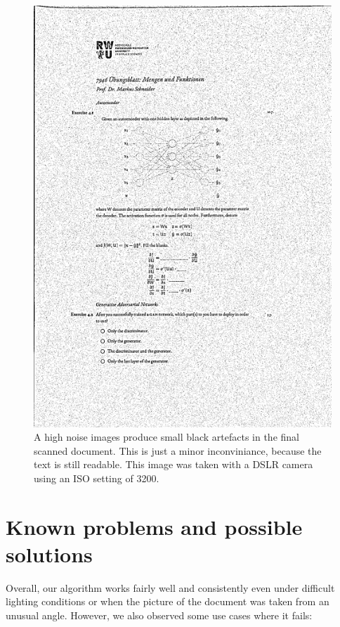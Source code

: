 \documentclass[bibliography=totoc]{scrartcl}
\begin{document}
	\begin{figure}[h!]
		\centering
		\includegraphics[width=0.3\linewidth]{imgs/threshold/noise.jpg}
		\caption{A high noise images produce small black artefacts in the final scanned document. This is just a minor inconviniance, because the text is still readable. This image was taken with a \acs{DSLR} camera using an ISO setting of 3200.}
		\label{fig:noise}
	\end{figure}

	\section{Known problems and possible solutions}
	Overall, our algorithm works fairly well and consistently even under difficult lighting conditions or when the picture of the document was taken from an unusual angle.
	However, we also observed some use cases where it fails:
\end{document}
